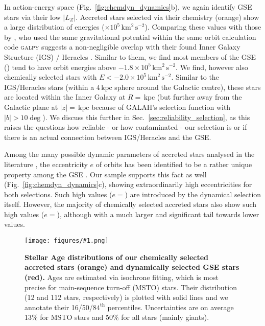 \documentclass[fleqn,usenatbib]{mnras}
\newcommand{\kpc}{\,\mathrm{kpc}}	%
\newcommand{\kmkmss}{\,\mathrm{km^2\,s^{-2}}}	%
\newcommand{\codeicon}{{\faCloudDownload}}
\newcommand{\codelink}[1]{\href{https://github.com/svenbuder/Accreted-stars-in-GALAH-DR3/tree/main/figures/#1.ipynb}{\codeicon}\,\,}
\newcommand{\oscaption}[2]{\caption{#2 \codelink{#1}}}
\newcommand{\figurecolumnwidth}[3]{\begin{figure} \centering \texttt{[image: figures/\#1.png]}\oscaption{#2}{#3}\label{fig:#1} \end{figure}}
\begin{document}
In action-energy space (Fig.~\ref{fig:chemdyn_dynamics}b), we again identify GSE stars via their low $\vert L_Z \vert$. Accreted stars selected via their chemistry (orange) show a large distribution of energies ($ \times 10^5 \kmkmss$). Comparing these values with those by \citet{Horta2021}, who used the same gravitational potential \citep{McMillan2017} within the same orbit calculation code \textsc{galpy} \citep{Bovy2015, Mackereth2018} suggests a non-negligible overlap with their found Inner Galaxy Structure (IGS) / Heracles \citep{Horta2021}. Similar to them, we find most members of the GSE () tend to have orbit energies above $-1.8 \times 10^5 \kmkmss$. We find, however also  chemically selected stars with $E < -2.0 \times 10^5 \kmkmss$. Similar to the IGS/Heracles stars (within a $4\kpc$ sphere around the Galactic centre), these stars are located within the Inner Galaxy at $R = $$ \kpc$ (but further away from the Galactic plane at $\vert z \vert =$$\kpc$ because of GALAH's selection function with $\vert b \vert > 10\deg$). We discuss this further in Sec.~\ref{sec:reliability_selection}, as this raises the questions how reliable - or how contaminated - our selection is or if there is an actual connection between IGS/Heracles and the GSE.

Among the many possible dynamic parameters of accreted stars analysed in the literature \citep[e.g.][]{Schuster2012}, the eccentricity $e$ of orbits has been identified to be a rather unique property among the GSE \citep{Mackereth2019, Naidu2020}. Our sample supports this fact as well (Fig.~\ref{fig:chemdyn_dynamics}c), showing extraordinarily high eccentricities for both selections. Such high values ($e=$) are introduced by the dynamical selection itself. However, the majority of chemically selected accreted stars also show such high values ($e=$), although with a much larger and significant tail towards lower values.

\figurecolumnwidth{age_histogram}{stellar_ages}{
\textbf{Stellar Age distributions of our chemically selected accreted stars (orange) and dynamically selected GSE stars (red).} Ages are estimated via isochrone fitting, which is most precise for main-sequence turn-off (MSTO) stars. Their distribution (12 and 112 stars, respectively) is plotted with solid lines and we annotate their 16/50/$84^\text{th}$ percentiles. Uncertainties are on average 13\% for MSTO stars and 50\% for all stars (mainly giants).
}
\end{document}
